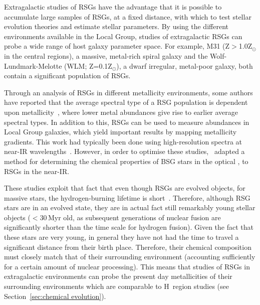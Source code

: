 
Extragalactic studies of RSGs have the advantage that it is possible to accumulate large samples of RSGs, at a fixed distance, with which to test stellar evolution theories and estimate stellar parameters.
By using the different environments available in the Local Group, studies of extragalactic RSGs can probe a wide range of host galaxy parameter space.
For example, M31 (Z$>$1.0Z$_{\odot}$ in the central regions), a massive, metal-rich spiral galaxy and the Wolf-Lundmark-Melotte (WLM; Z=0.1Z$_{\odot}$), a dwarf irregular, metal-poor galaxy, both contain a significant population of RSGs.

Through an analysis of RSGs in different metallicity environments, some authors have reported that the average spectral type of a RSG population is dependent upon metallicity~\citep{Elias85, MasseyOlsen03, 2012AJ....144....2L}, where lower metal abundances give rise to earlier average spectral types.
In addition to this, RSGs can be used to measure abundances in Local Group galaxies, which yield important results by mapping metallicity gradients.
This work had typically been done using high-resolution spectra at near-IR wavelengths~\citep{Cunha07, Davies09a,Davies09b}.
However, in order to optimise these studies,~\cite{2010MNRAS.407.1203D} adapted a method for determining the chemical properties of BSG stars in the optical
\citep{2008ApJ...681..269K,2010AN....331..459K}, to RSGs in the near-IR.

These studies exploit that fact that even though RSGs are evolved objects, for massive stars, the hydrogen-burning lifetime is short~\citep[just over 25\,Myr for a 8\,M$_{\odot}$ star and consequently shorter for higher mass stars][]{2012A&A...537A.146E}.
Therefore, although RSG stars are in an evolved state, they are in actual fact still remarkably young stellar objects ($<$30\,Myr old, as subsequent generations of nuclear fusion are significantly shorter than the time scale for hydrogen fusion).
Given the fact that these stars are very young, in general they have not had the time to travel a significant distance from their birth place.
Therefore, their chemical composition must closely match that of their surrounding environment (accounting sufficiently for a certain amount of nuclear processing).
This means that studies of RSGs in extragalactic environments can probe the present day metallicities of their surrounding environments which are comparable to H\,\2 region studies (see Section~\ref{sec:chemical evolution}).

